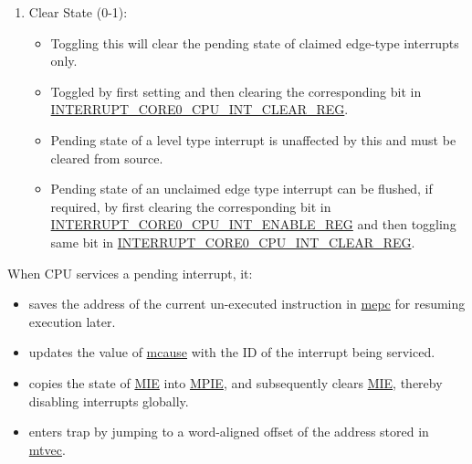 \documentclass[main\_\_EN.tex]{subfiles}
\begin{document}
\begin{enumerate}
\begin{itemize}
        \item For each interrupt ID, the corresponding bit in read-only \hyperref[regdesc:INTERRUPTCORE0CPUINTEIPSTATUSREG]{INTERRUPT\_CORE0\_CPU\_INT\_EIP\_STATUS\_REG} gives its pending state.
        \item A pending interrupt will cause CPU to enter trap if no other pending interrupt has higher priority.
        \item A pending interrupt is said to be 'claimed' if it preempts the CPU and causes it to jump to the corresponding trap vector address.
        \item All pending interrupts which are yet to be serviced are termed as 'unclaimed'.
    \end{itemize}
    \item Clear State (0-1):
    \begin{itemize}
        \item Toggling this will clear the pending state of claimed edge-type interrupts only.
        \item Toggled by first setting and then clearing the corresponding bit in \hyperref[regdesc:INTERRUPTCORE0CPUINTCLEARREG]{INTERRUPT\_CORE0\_CPU\_INT\_CLEAR\_REG}.
        \item Pending state of a level type interrupt is unaffected by this and must be cleared from source.
        \item Pending state of an unclaimed edge type interrupt can be flushed, if required, by first clearing the corresponding bit in \hyperref[regdesc:INTERRUPTCORE0CPUINTENABLEREG]{INTERRUPT\_CORE0\_CPU\_INT\_ENABLE\_REG} and then toggling same bit in \hyperref[regdesc:INTERRUPTCORE0CPUINTCLEARREG]{INTERRUPT\_CORE0\_CPU\_INT\_CLEAR\_REG}.
    \end{itemize}
\end{enumerate}

When CPU services a pending interrupt, it:
\begin{itemize}
    \item saves the address of the current un-executed instruction in \hyperref[regdesc:MEPC]{mepc} for resuming execution later.
    \item updates the value of \hyperref[regdesc:MCAUSE]{mcause} with the ID of the interrupt being serviced.
    \item copies the state of \hyperref[fielddesc:MSTATUSMIE]{MIE} into \hyperref[fielddesc:MSTATUSMPIE]{MPIE}, and subsequently clears \hyperref[fielddesc:MSTATUSMIE]{MIE}, thereby disabling interrupts globally.
    \item enters trap by jumping to a word-aligned offset of the address stored in \hyperref[regdesc:MTVEC]{mtvec}.
\end{itemize}
\end{document}
